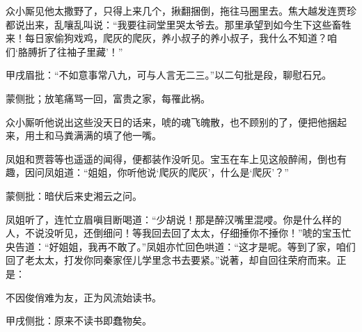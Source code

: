\begin{parag}
    众小厮见他太撒野了，只得上来几个，揪翻捆倒，拖往马圈里去。焦大越发连贾珍都说出来，乱嚷乱叫说：“我要往祠堂里哭太爷去。那里承望到如今生下这些畜牲来！每日家偷狗戏鸡，爬灰的爬灰，养小叔子的养小叔子，我什么不知道？咱们‘胳膊折了往袖子里藏’！”\begin{note}甲戌眉批：“不如意事常八九，可与人言无二三。”以二句批是段，聊慰石兄。\end{note}\begin{note}蒙侧批；放笔痛骂一回，富贵之家，每罹此祸。\end{note}众小厮听他说出这些没天日的话来，唬的魂飞魄散，也不顾别的了，便把他捆起来，用土和马粪满满的填了他一嘴。
\end{parag}


\begin{parag}
    凤姐和贾蓉等也遥遥的闻得，便都装作没听见。宝玉在车上见这般醉闹，倒也有趣，因问凤姐道：“姐姐，你听他说‘爬灰的爬灰’，什么是‘爬灰’？”\begin{note}蒙侧批：暗伏后来史湘云之问。\end{note}凤姐听了，连忙立眉嗔目断喝道：“少胡说！那是醉汉嘴里混唚。你是什么样的人，不说没听见，还倒细问！等我回去回了太太，仔细捶你不捶你！”唬的宝玉忙央告道：“好姐姐，我再不敢了。”凤姐亦忙回色哄道：“这才是呢。等到了家，咱们回了老太太，打发你同秦家侄儿学里念书去要紧。”说著，却自回往荣府而来。正是：
\end{parag}


\begin{poem}
    \begin{pl} 不因俊俏难为友，正为风流始读书。\end{pl}
    \begin{note}甲戌侧批：原来不读书即蠢物矣。\end{note}
\end{poem}
